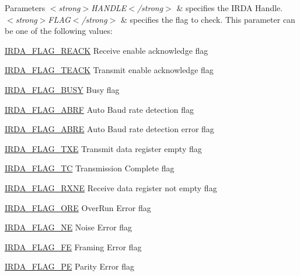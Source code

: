 \begin{DoxyParams}{Parameters}
{\em $<$strong$>$\+H\+A\+N\+D\+L\+E$<$/strong$>$} & specifies the I\+R\+DA Handle. \\
\hline
{\em $<$strong$>$\+F\+L\+A\+G$<$/strong$>$} & specifies the flag to check. This parameter can be one of the following values\+: \begin{DoxyItemize}
\item \hyperlink{group___i_r_d_a___flags_ga331e42c59ed0ce052f1f75cdc3282eb3}{I\+R\+D\+A\+\_\+\+F\+L\+A\+G\+\_\+\+R\+E\+A\+CK} Receive enable acknowledge flag \item \hyperlink{group___i_r_d_a___flags_gad85e4b7a95ba759e92680611750f5ed1}{I\+R\+D\+A\+\_\+\+F\+L\+A\+G\+\_\+\+T\+E\+A\+CK} Transmit enable acknowledge flag \item \hyperlink{group___i_r_d_a___flags_ga6353f0b1e0bd52c3ac114feaa0ca0cdd}{I\+R\+D\+A\+\_\+\+F\+L\+A\+G\+\_\+\+B\+U\+SY} Busy flag \item \hyperlink{group___i_r_d_a___flags_ga7e45c6d6604fcb3d4fbe8aa8fb7ee5c7}{I\+R\+D\+A\+\_\+\+F\+L\+A\+G\+\_\+\+A\+B\+RF} Auto Baud rate detection flag \item \hyperlink{group___i_r_d_a___flags_ga69409b95feb7c332d3261778a1d267f6}{I\+R\+D\+A\+\_\+\+F\+L\+A\+G\+\_\+\+A\+B\+RE} Auto Baud rate detection error flag \item \hyperlink{group___i_r_d_a___flags_ga88d22267566352225a9ec253d3976b0f}{I\+R\+D\+A\+\_\+\+F\+L\+A\+G\+\_\+\+T\+XE} Transmit data register empty flag \item \hyperlink{group___i_r_d_a___flags_gaea9a2c5c33c5fb8e0109801ba005712a}{I\+R\+D\+A\+\_\+\+F\+L\+A\+G\+\_\+\+TC} Transmission Complete flag \item \hyperlink{group___i_r_d_a___flags_ga044e8008f094da17c9c7371832079a73}{I\+R\+D\+A\+\_\+\+F\+L\+A\+G\+\_\+\+R\+X\+NE} Receive data register not empty flag \item \hyperlink{group___i_r_d_a___flags_gadd2f51365f80ae4ce344ba9eb6ab7b81}{I\+R\+D\+A\+\_\+\+F\+L\+A\+G\+\_\+\+O\+RE} Over\+Run Error flag \item \hyperlink{group___i_r_d_a___flags_ga01d432c277dde71d06e3452881affadd}{I\+R\+D\+A\+\_\+\+F\+L\+A\+G\+\_\+\+NE} Noise Error flag \item \hyperlink{group___i_r_d_a___flags_ga9cfd704788e477a3af6a5df18c957962}{I\+R\+D\+A\+\_\+\+F\+L\+A\+G\+\_\+\+FE} Framing Error flag \item \hyperlink{group___i_r_d_a___flags_ga54e075e6ed11a2b9bd7776ebd049211b}{I\+R\+D\+A\+\_\+\+F\+L\+A\+G\+\_\+\+PE} Parity Error flag \end{DoxyItemize}
\\
\hline
\end{DoxyParams}

